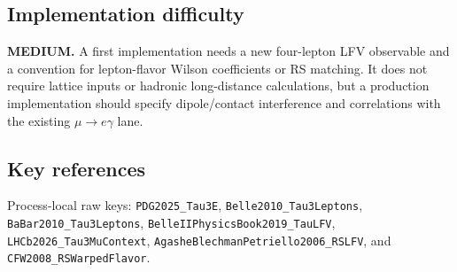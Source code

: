 \subsection*{Implementation difficulty}
\textbf{MEDIUM.}  A first implementation needs a new four-lepton LFV observable
and a convention for lepton-flavor Wilson coefficients or RS matching.  It
does not require lattice inputs or hadronic long-distance calculations, but a
production implementation should specify dipole/contact interference and
correlations with the existing \(\mu\to e\gamma\) lane.

\subsection*{Key references}
Process-local raw keys: \texttt{PDG2025\_Tau3E},
\texttt{Belle2010\_Tau3Leptons}, \texttt{BaBar2010\_Tau3Leptons},
\texttt{BelleIIPhysicsBook2019\_TauLFV},
\texttt{LHCb2026\_Tau3MuContext},
\texttt{AgasheBlechmanPetriello2006\_RSLFV}, and
\texttt{CFW2008\_RSWarpedFlavor}.
